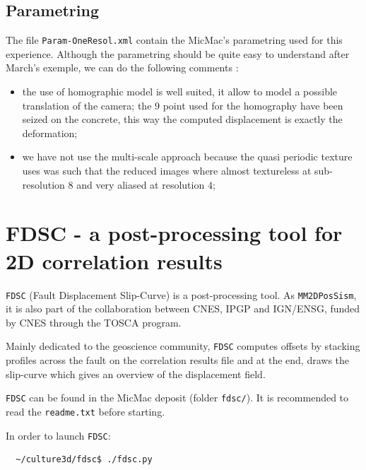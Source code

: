 \subsection{Parametring}


The file {\tt Param-OneResol.xml} contain the MicMac's parametring used for this experience.
Although the parametring should be quite easy to understand after March's exemple, we can
do the following comments :

\begin{itemize}
    \item  the use of homographic model is well suited, it allow to model a possible translation
          of the camera; the $9$ point used for the homography have been seized on the concrete, this
          way the computed displacement is exactly the deformation;

    \item  we have not use the multi-scale approach because the quasi periodic texture uses was
           such that the reduced images where almost textureless at sub-resolution $8$ and very
           aliased at resolution $4$;
\end{itemize}



\section{FDSC - a post-processing tool for 2D correlation results}

\verb+FDSC+ (Fault Displacement Slip-Curve) is a post-processing tool. As \verb+MM2DPosSism+, it is also part of the collaboration between CNES, IPGP and IGN/ENSG, funded by CNES through the TOSCA program.

Mainly dedicated to the geoscience community, \verb+FDSC+ computes offsets by stacking profiles across the fault on the correlation results file and at the end, draws the slip-curve which gives an overview of the displacement field.

\verb+FDSC+ can be found in the MicMac deposit (folder \verb+fdsc/+). It is recommended to read the \verb+readme.txt+ before starting.

In order to launch \verb+FDSC+:
\begin{verbatim}
  ~/culture3d/fdsc$ ./fdsc.py
\end{verbatim}


